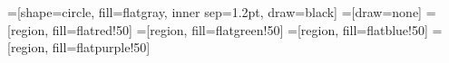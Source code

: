 =[shape=circle, fill=flatgray, inner sep=1.2pt, draw=black]
=[draw=none]
=[region, fill=flatred!50]
=[region, fill=flatgreen!50]
=[region, fill=flatblue!50]
=[region, fill=flatpurple!50]

\newcommand{\pointgrid}[4]{{
  \newcommand{\argxmin}{#1}
  \newcommand{\argxmax}{#2}
  \newcommand{\argymin}{#3}
  \newcommand{\argymax}{#4}

  \draw[] (\argxmin, 0) to (\argxmax, 0);
  \draw[] (0, \argymin) to (0, \argymax);
  \foreach \x in {\argxmin, ..., \argxmax} {
    \foreach \y in {\argymin, ..., \argymax} {
      \node[point] (\x-\y) at (\x, \y) {};
    }
  }
}}

\begin{figure}[ht]
  \centering

  \newcommand{\subfigwidth}{0.24\columnwidth}
  \newcommand{\subfighspace}{0.3cm}
  \newcommand{\tikzhspace}{0.4cm}
  \newcommand{\tikzscale}{0.25}
  \newcommand{\xmin}{-2}
  \newcommand{\xmax}{2}
  \newcommand{\ymin}{-2}
  \newcommand{\ymax}{2}


\end{figure}
